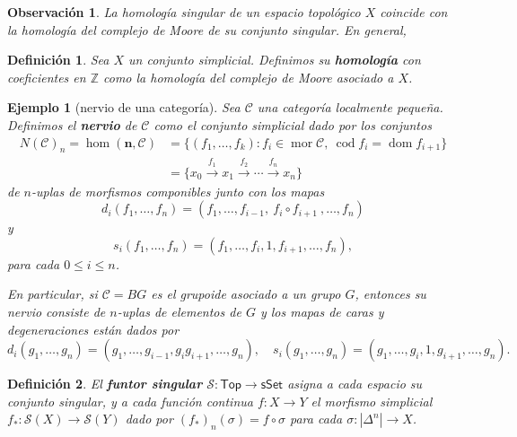 \documentclass[11pt]{report}
\theoremstyle{colored}
\newtheorem{definition}{Definición}[section]
\newtheorem{remark}{Observación}[section]
\newtheorem{example}{Ejemplo}[section]
\newcommand{\Z}{\mathbb{Z}}
\newcommand{\cat}[1]{\mathsf{#1}}
\renewcommand{\ss}[1]{\Delta^{#1}}
\begin{document}
\begin{remark} La homología singular de un espacio topológico $X$ coincide con la homología del complejo de Moore de su conjunto singular. En general,
\end{remark}

\begin{definition} Sea $X$ un conjunto simplicial. Definimos su \textbf{homología} con coeficientes en $\Z$ como la homología del complejo de Moore asociado a $X$.
\end{definition}

\begin{example}[nervio de una categoría] Sea $\mathscr{C}$ una categoría localmente pequeña. Definimos el \textbf{nervio} de  $\mathscr{C}$ como el conjunto simplicial dado por los conjuntos
\begin{align*}
N(\mathscr{C})_n = \hom(\mathbf{n},\mathscr{C}) &= \{(f_1,\dots, f_k) : f_i \in \operatorname{mor} \mathscr{C}, \ \operatorname{cod} f_i = \operatorname{dom}f_{i+1}\}\\
& = \{x_0 \xrightarrow{f_1} x_1 \xrightarrow{f_2} \cdots \xrightarrow{f_n} x_n\}
\end{align*}
de $n$-uplas de morfismos componibles junto con los mapas 
\[
d_i(f_1, \dots, f_n) = (f_1, \dots,f_{i-1}, \ f_i \circ f_{i+1} \ ,\dots,f_n)
\]
y
\[
s_i(f_1, \dots, f_n) = (f_1, \dots, f_i, 1, f_{i+1},\dots,f_n),
\]
para cada $0 \leq i \leq n$. 

En particular, si $\mathscr{C} = BG$ es el grupoide asociado a un grupo $G$, entonces su nervio consiste de $n$-uplas de elementos de $G$ y los mapas de caras y degeneraciones están dados por
\[
d_i(g_1, \dots, g_n) = (g_1,\dots, g_{i-1},g_ig_{i+1},\dots,g_n), \quad s_i(g_1, \dots,g_n) = (g_1, \dots,g_i,1,g_{i+1},\dots,g_n).
\]
\end{example}

\begin{definition} El \textbf{funtor singular} $\mathcal{S} : \cat{Top} \to \cat{sSet}$ asigna a cada espacio su conjunto singular, y a cada función continua $f : X \to Y$ el morfismo simplicial $f_* : \mathcal{S}(X) \to \mathcal{S}(Y)$ dado por $(f_*)_n(\sigma) =  f \circ \sigma$ para cada $\sigma: |\ss{n}| \to X$.
\end{definition}
\end{document}
